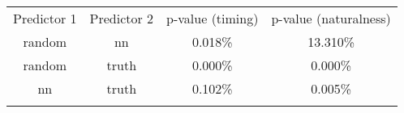 \begin{tabular}{cccc}
\hline\noalign{\smallskip}
Predictor 1 & Predictor 2 & p-value (timing) & p-value (naturalness) \\
\noalign{\smallskip}\svhline\noalign{\smallskip}
random & nn & 0.018\% & 13.310\% \\
random & truth & 0.000\% & 0.000\% \\
nn & truth & 0.102\% & 0.005\% \\
\noalign{\smallskip}\hline\noalign{\smallskip}
\end{tabular}
